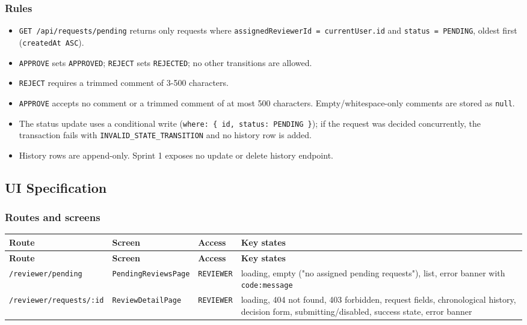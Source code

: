 \documentclass[11pt,a4paper]{article}
\begin{document}
\subsubsection{Rules}

\begin{itemize}[leftmargin=*,itemsep=2pt,topsep=2pt]
  \item \texttt{GET /api/requests/pending} returns only requests where \texttt{assignedReviewerId = currentUser.id} and \texttt{status = PENDING}, oldest first (\texttt{createdAt ASC}).
  \item \texttt{APPROVE} sets \texttt{APPROVED}; \texttt{REJECT} sets \texttt{REJECTED}; no other transitions are allowed.
  \item \texttt{REJECT} requires a trimmed comment of 3-500 characters.
  \item \texttt{APPROVE} accepts no comment or a trimmed comment of at most 500 characters. Empty/whitespace-only comments are stored as \texttt{null}.
  \item The status update uses a conditional write (\texttt{where: \{ id, status: PENDING \}}); if the request was decided concurrently, the transaction fails with \texttt{INVALID\_STATE\_TRANSITION} and no history row is added.
  \item History rows are append-only. Sprint 1 exposes no update or delete history endpoint.
\end{itemize}

\subsection{UI Specification}

\subsubsection{Routes and screens}

\vspace{0.3em}
\begin{longtable}{|>{\RaggedRight}p{4.2cm}|>{\RaggedRight}p{3.2cm}|>{\centering\arraybackslash}p{2.0cm}|>{\RaggedRight}p{5.3cm}|}
\hline
\rowcolor{zenPale}\textbf{Route} & \textbf{Screen} & \textbf{Access} & \textbf{Key states} \\ \hline
\endfirsthead
\hline
\rowcolor{zenPale}\textbf{Route} & \textbf{Screen} & \textbf{Access} & \textbf{Key states} \\ \hline
\endhead
\hline
\endfoot
\texttt{/\allowbreak reviewer/\allowbreak pending} & \texttt{PendingReviewsPage} & \texttt{REVIEWER} & loading, empty ("no assigned pending requests"), list, error banner with \texttt{code:\allowbreak  message} \\ \hline
\texttt{/\allowbreak reviewer/\allowbreak requests/\allowbreak :\allowbreak id} & \texttt{ReviewDetailPage} & \texttt{REVIEWER} & loading, 404 not found, 403 forbidden, request fields, chronological history, decision form, submitting/disabled, success state, error banner \\ \hline
\end{longtable}
\vspace{0.3em}
\end{document}
